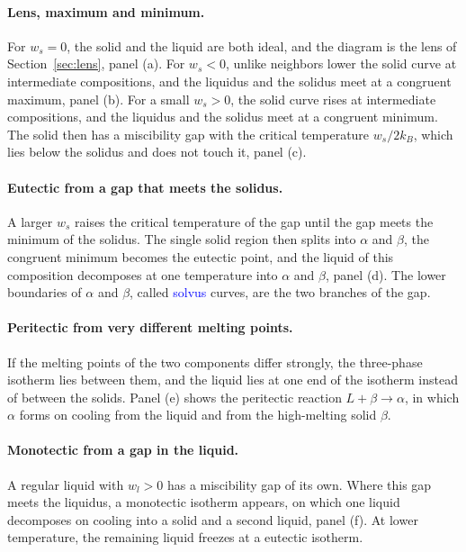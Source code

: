 \paragraph{Lens, maximum and minimum.}
For $w_s=0$, the solid and the liquid are both ideal, and the diagram is the
lens of Section~\ref{sec:lens}, panel (a). For $w_s<0$, unlike neighbors
lower the solid curve at intermediate compositions, and the liquidus and the
solidus meet at a congruent maximum, panel (b). For a small $w_s>0$, the
solid curve rises at intermediate compositions, and the liquidus and the
solidus meet at a congruent minimum. The solid then has a miscibility gap
with the critical temperature $w_s/2k_B$, which lies below the solidus and
does not touch it, panel (c).

\paragraph{Eutectic from a gap that meets the solidus.}
A larger $w_s$ raises the critical temperature of the gap until the gap
meets the minimum of the solidus. The single solid region then splits into
$\alpha$ and $\beta$, the congruent minimum becomes the eutectic point, and
the liquid of this composition decomposes at one temperature into $\alpha$
and $\beta$, panel (d). The lower boundaries of $\alpha$ and $\beta$, called
\textcolor{blue}{solvus} curves, are the two branches of the gap.

\paragraph{Peritectic from very different melting points.}
If the melting points of the two components differ strongly, the three-phase
isotherm lies between them, and the liquid lies at one end of the isotherm
instead of between the solids. Panel (e) shows the peritectic reaction
$L+\beta\to\alpha$, in which $\alpha$ forms on cooling from the liquid and
from the high-melting solid $\beta$.

\paragraph{Monotectic from a gap in the liquid.}
A regular liquid with $w_l>0$ has a miscibility gap of its own. Where this
gap meets the liquidus, a monotectic isotherm appears, on which one liquid
decomposes on cooling into a solid and a second liquid, panel (f). At lower
temperature, the remaining liquid freezes at a eutectic isotherm.

